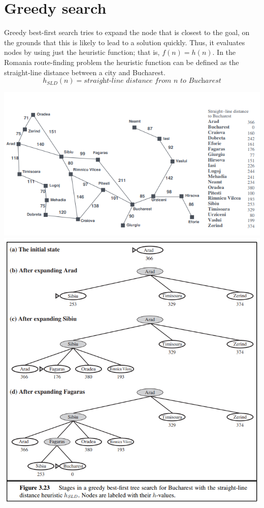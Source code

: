 \section{Greedy search}
Greedy best-first search tries to expand the node that is closest to the goal, on the grounds that this is likely to lead to a solution quickly. Thus, it evaluates nodes by using just the heuristic function; that is, $f(n) = h(n)$.\newline\newline
In the Romania route-finding problem the heuristic function can be defined as the straight-line distance between a city and Bucharest.
\[h_{SLD}(n) =  \textit{straight-line distance from n to Bucharest}\]
\begin{center}
    \includegraphics[]{images/heuristic.png}
    \includegraphics[]{images/greedy-approach.png}
\end{center}
